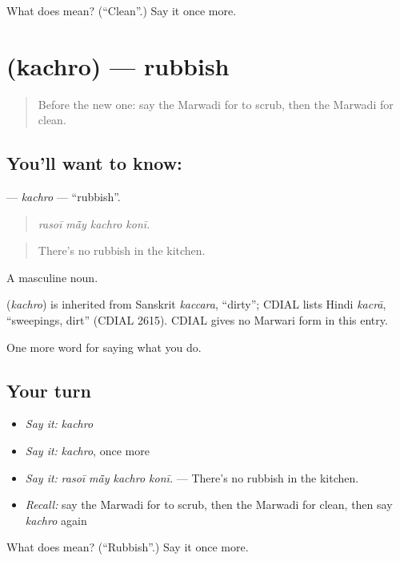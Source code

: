 \begin{tcolorbox}[breakable,colback=teal!4,colframe=teal!35!black,title={Before you move on}]
What does  mean? (\textquotedblleft{}Clean\textquotedblright{}.) Say it once more.
\end{tcolorbox}
\section[\texorpdfstring{\mw{कचरो} (kachro)}{कचरो (kachro)}]{ (kachro) — rubbish}

\label{lesson:MW-C171-kachro}



\begin{quote}
Before the new one: say the Marwadi for to scrub, then the Marwadi for clean.
\end{quote}

\subsection*{You'll want to know: }
\textbf{} — \emph{kachro} — \textquotedblleft{}rubbish\textquotedblright{}.

\begin{quote}
   
\end{quote}

\begin{quote}
\emph{rasoī mā̃y kachro konī.}
\end{quote}

\begin{quote}
There's no rubbish in the kitchen.
\end{quote}

A masculine noun.

\begin{cousinweb}
\textbf{} (\emph{kachro}) is inherited from Sanskrit \emph{kaccara}, \textquotedblleft{}dirty\textquotedblright{}; CDIAL lists Hindi \emph{kacrā}, \textquotedblleft{}sweepings, dirt\textquotedblright{} (CDIAL 2615). CDIAL gives no Marwari form in this entry.
\end{cousinweb}

\begin{grammarlens}[title={What you've built}]
One more word for saying what you do.
\end{grammarlens}

\subsection*{Your turn}
\begin{itemize}
\raggedright
  \item \emph{Say it:} \emph{kachro}
  \item \emph{Say it:} \emph{kachro}, once more
  \item \emph{Say it:} \emph{rasoī mā̃y kachro konī.} — There's no rubbish in the kitchen.
  \item \emph{Recall:} say the Marwadi for to scrub, then the Marwadi for clean, then say \emph{kachro} again
\end{itemize}

\begin{tcolorbox}[breakable,colback=teal!4,colframe=teal!35!black,title={Before you move on}]
What does  mean? (\textquotedblleft{}Rubbish\textquotedblright{}.) Say it once more.
\end{tcolorbox}
